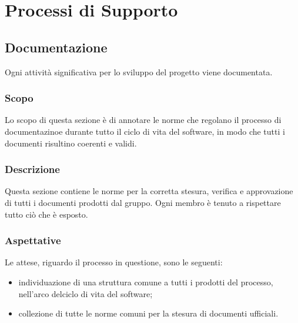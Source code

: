 \section{Processi di Supporto}
    \subsection{Documentazione}
    Ogni attività significativa per lo sviluppo del progetto viene documentata.
        \subsubsection{Scopo}
        Lo scopo di questa sezione è di annotare le norme che regolano il processo di documentazinoe durante tutto il ciclo di vita del software, in modo che tutti i documenti risultino coerenti e validi.
        \subsubsection{Descrizione}
        Questa sezione contiene le norme per la corretta stesura, verifica e approvazione di tutti i documenti prodotti dal gruppo. Ogni membro è tenuto a rispettare tutto ciò che è esposto.
        \subsubsection{Aspettative}
        Le attese, riguardo il processo in questione, sono le seguenti:
        \begin{itemize}
            \item individuazione di una struttura comune a tutti i prodotti del processo, nell’arco delciclo di vita del software;
            \item collezione di tutte le norme comuni per la stesura di documenti ufficiali.
        \end{itemize}
